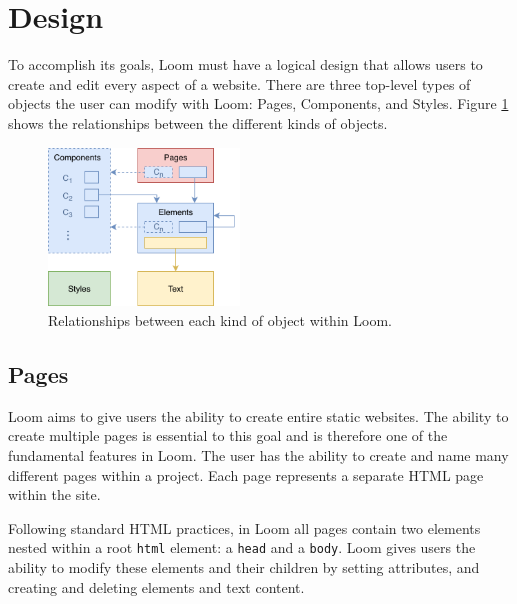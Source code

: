 \documentclass[conference, letterpaper]{IEEEtran}
\begin{document}

\section{Design}
To accomplish its goals, Loom must have a logical design that allows users to create and edit every aspect of a website. There are three top-level types of objects the user can modify with Loom: Pages, Components, and Styles. Figure \ref{fig:design} shows the relationships between the different kinds of objects.

\begin{figure}[!t]
  \centering
  \includegraphics[width=2in]{../design.png}
  \caption{Relationships between each kind of object within Loom.}
  \label{fig:design}
\end{figure}

\subsection{Pages}
Loom aims to give users the ability to create entire static websites. The ability to create multiple pages is essential to this goal and is therefore one of the fundamental features in Loom. The user has the ability to create and name many different pages within a project. Each page represents a separate HTML page within the site.

Following standard HTML practices, in Loom all pages contain two elements nested within a root \texttt{html} element: a \texttt{head} and a \texttt{body}. Loom gives users the ability to modify these elements and their children by setting attributes, and creating and deleting elements and text content.
\end{document}
